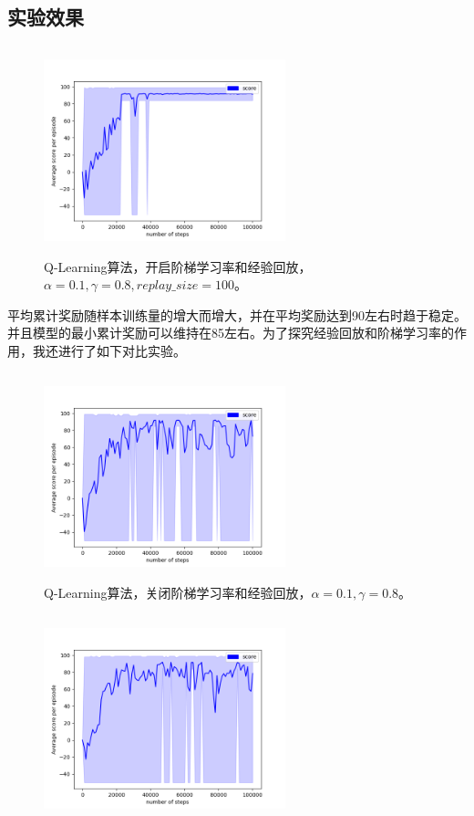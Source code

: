 \documentclass[a4paper,12pt]{article}
\begin{document}
\begin{CJK}{UTF8}{gbsn}
\section{实验效果}
\begin{figure}[h!]
	\centering
	\includegraphics[width=7cm,height=6cm]{./code/performance.png}
	\caption{Q-Learning算法，开启阶梯学习率和经验回放，$\alpha=0.1,\gamma=0.8,replay\_size=100$。}
	\label{performance}
\end{figure}
平均累计奖励随样本训练量的增大而增大，并在平均奖励达到90左右时趋于稳定。并且模型的最小累计奖励可以维持在85左右。为了探究经验回放和阶梯学习率的作用，我还进行了如下对比实验。
\begin{figure}[h!]
	\centering
	\includegraphics[width=7cm,height=6cm]{./code/performance_al=0.1_ga=0.8.png}
	\caption{Q-Learning算法，关闭阶梯学习率和经验回放，$\alpha=0.1,\gamma=0.8$。}
	\label{performance}
\end{figure}
\begin{figure}[h!]
	\centering
	\includegraphics[width=7cm,height=6cm]{./code/performance_al=0.1_ga=0.8_rs=100.png}

\end{figure}
\end{CJK}
\end{document}
